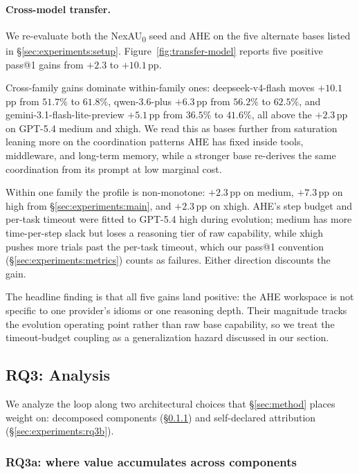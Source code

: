 

\paragraph{Cross-model transfer.}
We re-evaluate both the NexAU\textsubscript{0} seed and AHE on the five alternate bases listed in \S\ref{sec:experiments:setup}. Figure~\ref{fig:transfer-model} reports five positive pass@1 gains from $+2.3$ to $+10.1$\,pp.

Cross-family gains dominate within-family ones: deepseek-v4-flash moves $+10.1$\,pp from $51.7\%$ to $61.8\%$, qwen-3.6-plus $+6.3$\,pp from $56.2\%$ to $62.5\%$, and gemini-3.1-flash-lite-preview $+5.1$\,pp from $36.5\%$ to $41.6\%$, all above the $+2.3$\,pp on GPT-5.4 medium and xhigh. We read this as bases further from saturation leaning more on the coordination patterns AHE has fixed inside tools, middleware, and long-term memory, while a stronger base re-derives the same coordination from its prompt at low marginal cost.

Within one family the profile is non-monotone: $+2.3$\,pp on medium, $+7.3$\,pp on high from \S\ref{sec:experiments:main}, and $+2.3$\,pp on xhigh. AHE's step budget and per-task timeout were fitted to GPT-5.4 high during evolution; medium has more time-per-step slack but loses a reasoning tier of raw capability, while xhigh pushes more trials past the per-task timeout, which our pass@1 convention (\S\ref{sec:experiments:metrics}) counts as failures. Either direction discounts the gain.

The headline finding is that all five gains land positive: the AHE workspace is not specific to one provider's idioms or one reasoning depth. Their magnitude tracks the evolution operating point rather than raw base capability, so we treat the timeout-budget coupling as a generalization hazard discussed in our  section.

\subsection{RQ3: Analysis}
\label{sec:experiments:mechanism}

We analyze the loop along two architectural choices that \S\ref{sec:method} places weight on: decomposed components (\S\ref{sec:experiments:rq3a}) and self-declared attribution (\S\ref{sec:experiments:rq3b}).


\subsubsection{RQ3a: where value accumulates across components}
\label{sec:experiments:rq3a}


